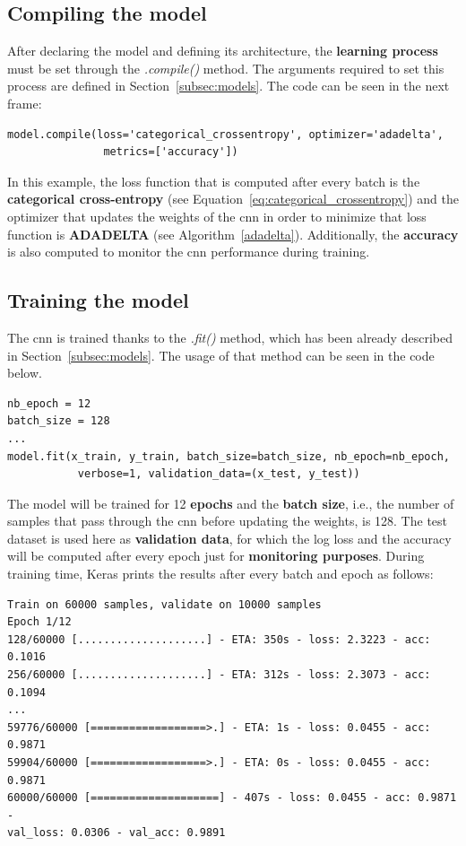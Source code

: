 \subsection{Compiling the model}
After declaring the model and defining its architecture, the \textbf{learning process} must be set through the  \textit{.compile()} method. The arguments required to set this process are defined in Section~\ref{subsec:models}. The code can be seen in the next frame:
\begin{lstlisting}
model.compile(loss='categorical_crossentropy', optimizer='adadelta', 
               metrics=['accuracy'])
\end{lstlisting}

In this example, the loss function that is computed after every batch is the \textbf{categorical cross-entropy} (see Equation~\ref{eq:categorical_crossentropy}) and the optimizer that updates the weights of the \gls{cnn} in order to minimize that loss function is \textbf{ADADELTA} (see Algorithm~\ref{adadelta}). Additionally, the \textbf{accuracy} is also computed to monitor the \gls{cnn} performance during training.

\subsection{Training the model}
The \gls{cnn} is trained thanks to the \textit{.fit()} method, which has been already described in Section~\ref{subsec:models}. The usage of that method can be seen in the code below.
\begin{lstlisting}
nb_epoch = 12
batch_size = 128
...
model.fit(x_train, y_train, batch_size=batch_size, nb_epoch=nb_epoch,
           verbose=1, validation_data=(x_test, y_test))
\end{lstlisting}

The model will be trained for 12 \textbf{epochs} and the \textbf{batch size}, i.e., the number of samples that pass through the \gls{cnn} before updating the weights, is 128. The test dataset is used here as \textbf{validation data}, for which the log loss and the accuracy will be computed after every epoch just for \textbf{monitoring purposes}. During training time, Keras prints the results after every batch and epoch as follows:
\begin{Verbatim}[frame=single]
Train on 60000 samples, validate on 10000 samples
Epoch 1/12
128/60000 [....................] - ETA: 350s - loss: 2.3223 - acc: 0.1016
256/60000 [....................] - ETA: 312s - loss: 2.3073 - acc: 0.1094
...
59776/60000 [==================>.] - ETA: 1s - loss: 0.0455 - acc: 0.9871
59904/60000 [==================>.] - ETA: 0s - loss: 0.0455 - acc: 0.9871
60000/60000 [====================] - 407s - loss: 0.0455 - acc: 0.9871 - 
val_loss: 0.0306 - val_acc: 0.9891
\end{Verbatim}

